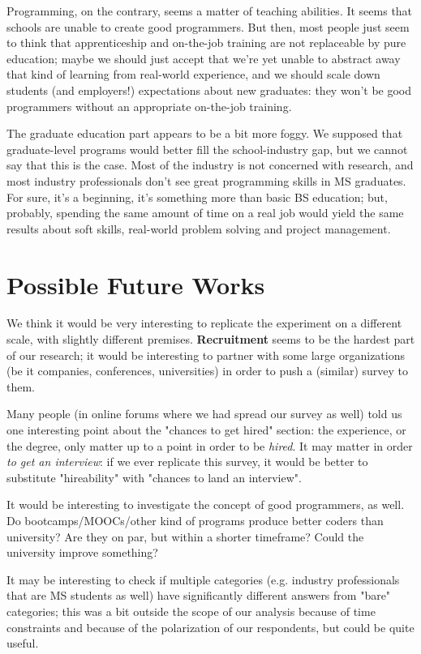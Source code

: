 \documentclass{sigchi}
\begin{document}
Programming, on the contrary, seems a matter of teaching abilities. It seems that schools are unable to create good programmers. But then, most people just seem to think that apprenticeship and on-the-job training are not replaceable by pure education; maybe we should just accept that we're yet unable to abstract away that kind of learning from real-world experience, and we should scale down students (and employers!) expectations about new graduates: they won't be good programmers without an appropriate on-the-job training.

The graduate education part appears to be a bit more foggy. We supposed that graduate-level programs would better fill the school-industry gap, but we cannot say that this is the case. Most of the industry is not concerned with research, and most industry professionals don't see great programming skills in MS graduates. For sure, it's a beginning, it's something more than basic BS education; but, probably, spending the same amount of time on a real job would yield the same results about soft skills, real-world problem solving and project management.

\section{Possible Future Works}
We think it would be very interesting to replicate the experiment on a different scale, with slightly different premises. \textbf{Recruitment} seems to be the hardest part of our research; it would be interesting to partner with some large organizations (be it companies, conferences, universities) in order to push a (similar) survey to them.

Many people (in online forums where we had spread our survey as well) told us one interesting point about the "chances to get hired" section: the experience, or the degree, only matter up to a point in order to be \textit{hired}. It may matter in order \textit{to get an interview}: if we ever replicate this survey, it would be better to substitute "hireability" with "chances to land an interview".

It would be interesting to investigate the concept of good programmers, as well. Do bootcamps/MOOCs/other kind of programs produce better coders than university? Are they on par, but within a shorter timeframe? Could the university improve something?

It may be interesting to check if multiple categories (e.g. industry professionals that are MS students as well) have significantly different answers from "bare" categories; this was a bit outside the scope of our analysis because of time constraints and because of the polarization of our respondents, but could be quite useful.
\end{document}
